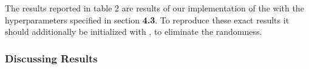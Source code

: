 The results reported in table 2 are results of our implementation of the  with the hyperparameters specified in section \textbf{4.3}.
To reproduce these exact results it should additionally be initialized with , to eliminate the randomness.



\subsubsection{Discussing Results}







